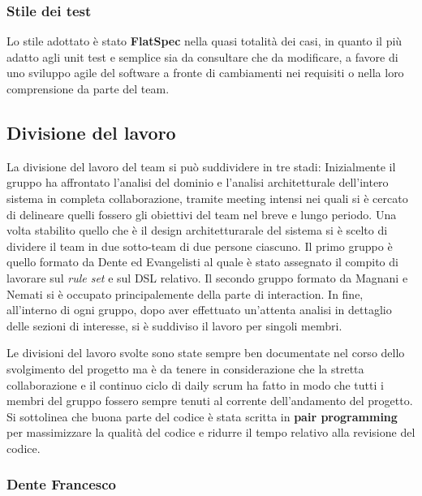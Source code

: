 \subsubsection{Stile dei test}
Lo stile adottato è stato \textbf{FlatSpec} nella quasi totalità dei casi, in quanto il più adatto agli unit test e semplice sia da consultare che da modificare, a favore di uno sviluppo agile del software a fronte di cambiamenti nei requisiti o nella loro comprensione da parte del team.


\subsection{Divisione del lavoro}
La divisione del lavoro del team si può suddividere in tre stadi:
%
Inizialmente il gruppo ha affrontato l'analisi del dominio e l'analisi architetturale dell'intero sistema in completa collaborazione, tramite meeting intensi nei quali si è cercato di delineare quelli fossero gli obiettivi del team nel breve e lungo periodo.
%
Una volta stabilito quello che è il design architetturarale del sistema si è scelto di dividere il team in due sotto-team di due persone ciascuno.
%
Il primo gruppo è quello formato da Dente ed Evangelisti al quale è stato assegnato il compito di lavorare sul \textit{rule set} e sul DSL relativo.
%
Il secondo gruppo formato da Magnani e Nemati si è occupato principalemente della parte di interaction.
%
In fine, all'interno di ogni gruppo, dopo aver effettuato un'attenta analisi in dettaglio delle sezioni di interesse, si è suddiviso il lavoro per singoli membri.

Le divisioni del lavoro svolte sono state sempre ben documentate nel corso dello svolgimento del progetto ma è da tenere in considerazione che la stretta collaborazione e il continuo ciclo di daily scrum ha fatto in modo che tutti i membri del gruppo fossero sempre tenuti al corrente dell'andamento del progetto.
%
Si sottolinea che buona parte del codice è stata scritta in \textbf{pair programming} per massimizzare la qualità del codice e ridurre il tempo relativo alla revisione del codice.

\subsubsection{Dente Francesco}


